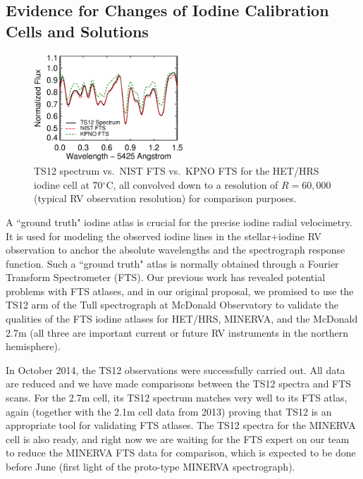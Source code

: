\documentclass[12pt]{article}
\def\degree{^{\circ}}
\begin{document}
\vspace{-10pt}
\subsection{Evidence for Changes of Iodine Calibration Cells and Solutions}\label{sec:fts}
\vspace{-5pt}


\begin{figure}
  \vspace{-35pt}
  \begin{center}
    \includegraphics[width=0.5\textwidth]{het70_comp}
  \end{center}
  \vspace{-25pt}  
  \caption{TS12 spectrum vs.\ NIST FTS vs.\ KPNO FTS for the HET/HRS
    iodine cell at 70$\degree$C, all convolved down to a resolution of
    $R=60,000$ (typical RV observation resolution) for comparison
    purposes.}
  \vspace{-8pt}  
  \label{fig:fts}
\end{figure}


A ``ground truth" iodine atlas is crucial for the precise iodine
radial velocimetry. It is used for modeling the observed iodine lines
in the stellar$+$iodine RV observation to anchor the absolute
wavelengths and the spectrograph response function. Such a ``ground
truth" atlas is normally obtained through a Fourier Transform
Spectrometer (FTS). Our previous work has revealed potential problems
with FTS atlases, and in our original proposal, we promised to use the
TS12 arm of the Tull spectrograph at McDonald Observatory to validate
the qualities of the FTS iodine atlases for HET/HRS, MINERVA, and the
McDonald 2.7m (all three are important current or future RV
instruments in the northern hemisphere).

In October 2014, the TS12 observations were successfully carried
out. All data are reduced and we have made comparisons between the
TS12 spectra and FTS scans. For the 2.7m cell, its TS12 spectrum
matches very well to its FTS atlas, again (together with the 2.1m cell
data from 2013) proving that TS12 is an appropriate tool for
validating FTS atlases. The TS12 spectra for the MINERVA cell is also
ready, and right now we are waiting for the FTS expert on our team to
reduce the MINERVA FTS data for comparison, which is expected to be
done before June (first light of the proto-type MINERVA spectrograph).
\end{document}
